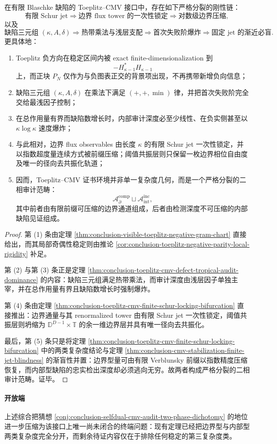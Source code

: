 \begin{theorem}\label{thm:conclusion-toeplitz-cmv-boundary-internal-binary-rigidity-chain}
在有限 Blaschke 缺陷的 Toeplitz--CMV 接口中，存在如下严格分裂的刚性链：
\[
\text{有限 Schur jet}
\Longrightarrow
\text{边界 flux tower 的一次性锁定}
\Longrightarrow
\text{对数级边界压缩},
\]
以及
\[
\text{缺陷三元组 }(\kappa,A,\delta)
\Longrightarrow
\text{热带乘法与浅层支配}
\Longrightarrow
\text{首次失败阶爆炸}
\Longrightarrow
\text{固定 jet 的渐近必盲}.
\]
更具体地：
\begin{enumerate}
  \item Toeplitz 负方向在稳定区间内被 exact finite-dimensionalization 到
  \[
  -H_{\kappa-1}^*H_{\kappa-1}
  \]
  上，而正块 \(P_N\) 仅作为与负图表正交的背景项出现，不再携带新增负向信息；
  \item 缺陷三元组 \((\kappa,A,\delta)\) 在乘法下满足 \((+,+,\min)\) 律，并把首次失败阶完全交给最浅因子控制；
  \item 在总作用量有界而缺陷数增长时，内部审计深度必至少线性、在负实侧甚至以 \(\kappa\log\kappa\) 速度爆炸；
  \item 与此相对，边界 flux observables 由长度 \(\kappa\) 的有限 Schur jet 一次性锁定，并以指数超度量连续方式被前缀压缩；阈值共振层则只保留一枚边界相位自由度及唯一的径向去共振化轨道；
  \item 因而，Toeplitz--CMV 证书环境并非单一复杂度几何，而是一个严格分裂的二相审计范畴：
  \[
  \mathscr A_{\partial}^{\mathrm{comp}}
  \sqcup
  \mathscr A_{\mathrm{int}}^{\mathrm{inc}},
  \]
  其中前者由有限前缀可压缩的边界通道组成，后者由检测深度不可压缩的内部缺陷见证组成。
\end{enumerate}
\end{theorem}
\begin{proof}
第 (1) 条由定理 \ref{thm:conclusion-visible-toeplitz-negative-gram-chart} 直接给出，而其局部奇偶性稳定则由推论 \ref{cor:conclusion-toeplitz-negative-parity-local-rigidity} 补足。

第 (2) 与第 (3) 条正是定理 \ref{thm:conclusion-toeplitz-cmv-defect-tropical-audit-dominance} 的内容：缺陷三元组满足热带乘法，而审计深度由浅层因子单独主宰，并在总作用量有界且缺陷数增长时强制爆炸。

第 (4) 条由定理 \ref{thm:conclusion-toeplitz-cmv-finite-schur-locking-bifurcation} 直接推出：边界通量与其 renormalized tower 由有限 Schur jet 一次性锁定，阈值共振层则坍缩为 \(\mathbb D^{D-1}\times\mathbb T\) 的余一维边界层并具有唯一径向去共振化。

最后，第 (5) 条只是将定理 \ref{thm:conclusion-toeplitz-cmv-finite-schur-locking-bifurcation} 中的两类复杂度结论与定理 \ref{thm:conclusion-cmv-stabilization-finite-jet-blindness} 的渐盲性并置：边界型量可由有限 Verblunsky 前缀以指数精度压缩恢复，而内部型缺陷的忠实检出深度却必须逃向无穷。故两者构成严格分裂的二相审计范畴。证毕。
\end{proof}

\paragraph{开放端}
上述综合把猜想 \ref{conj:conclusion-selfdual-cmv-audit-two-phase-dichotomy} 的地位进一步压缩为该接口上唯一尚未闭合的终端问题：现有定理已经把边界型与内部型两类复杂度完全分开，而剩余待证内容仅在于排除任何稳定的第三复杂度类。

\endinput
